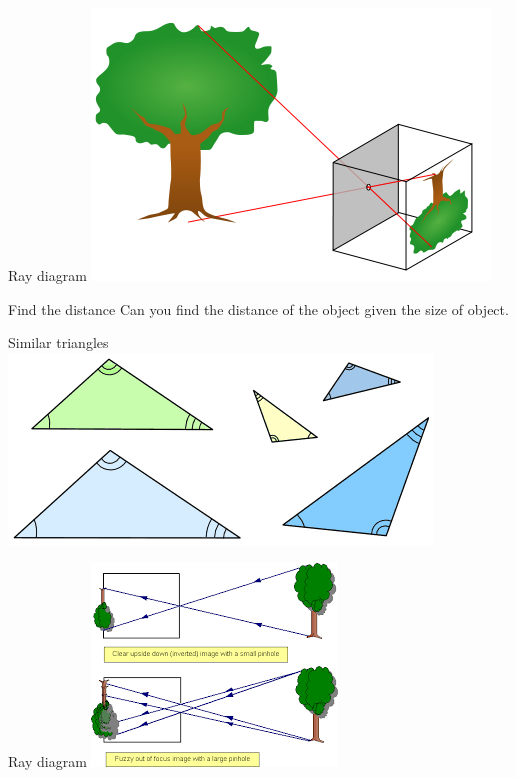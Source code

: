 \begin{frame}{Ray diagram}
  \includegraphics[width=\textwidth]{media/pinhole.png}
\end{frame}

\begin{frame}{Find the distance }
  Can you find the distance of the object given the size of object.
\end{frame}

\begin{frame}{Similar triangles}
  \includegraphics[width=\textwidth]{media/tri-similar1.png}
\end{frame}

\begin{frame}{Ray diagram}
  \includegraphics[width=\textwidth]{media/pinhole_blurred.png}
\end{frame}

